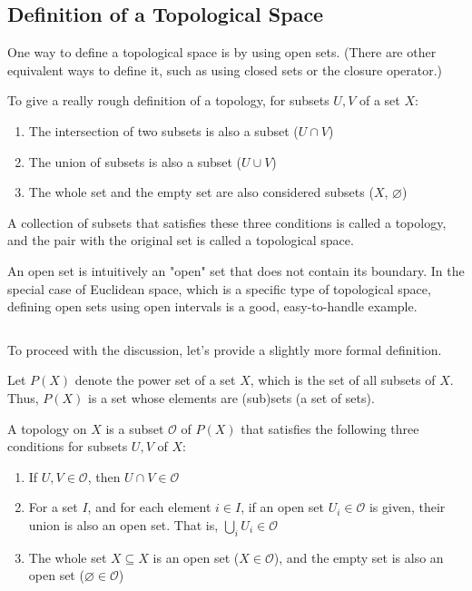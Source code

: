 \documentclass{article}
\begin{document}
\subsection{Definition of a Topological Space}

One way to define a topological space is by using open sets.
(There are other equivalent ways to define it, such as using closed sets or the closure operator.)

To give a really rough definition of a topology, for subsets $U,V$ of a set $X$:

\begin{enumerate}
	\item The intersection of two subsets is also a subset ($U \cap V$)
	\item The union of subsets is also a subset ($U \cup V$)
	\item The whole set and the empty set are also considered subsets ($X$, $\varnothing$)
\end{enumerate}

A collection of subsets that satisfies these three conditions is called a topology, and the pair with the original set is called a topological space.

An open set is intuitively an "open" set that does not contain its boundary. In the special case of Euclidean space, which is a specific type of topological space, defining open sets using open intervals is a good, easy-to-handle example.

${}$

To proceed with the discussion, let's provide a slightly more formal definition.

Let $P(X)$ denote the power set of a set $X$, which is the set of all subsets of $X$.
Thus, $P(X)$ is a set whose elements are (sub)sets (a set of sets).

A topology on $X$ is a subset $\mathcal{O}$ of $P(X)$ that satisfies the following three conditions for subsets $U,V$ of $X$:
\begin{enumerate}
	\item If $U,V \in {\mathcal O}$, then $U \cap V \in {\mathcal O}$
	\item For a set $I$, and for each element $i \in I$, if an open set $U_{i} \in {\mathcal O}$ is given,
	      their union is also an open set. That is, $\bigcup_{i} U_{i} \in {\mathcal O}$
	\item The whole set $X \subseteq X$ is an open set ($X \in {\mathcal O}$), and the empty set is also an open set ($\varnothing \in {\mathcal O}$)
\end{enumerate}
\end{document}
